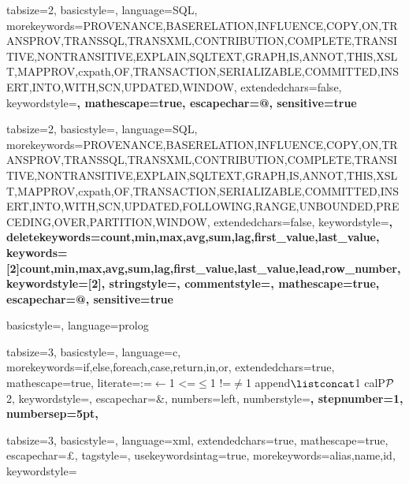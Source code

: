


{
tabsize=2,
basicstyle=\footnotesize\upshape\ttfamily,
language=SQL,
morekeywords={PROVENANCE,BASERELATION,INFLUENCE,COPY,ON,TRANSPROV,TRANSSQL,TRANSXML,CONTRIBUTION,COMPLETE,TRANSITIVE,NONTRANSITIVE,EXPLAIN,SQLTEXT,GRAPH,IS,ANNOT,THIS,XSLT,MAPPROV,cxpath,OF,TRANSACTION,SERIALIZABLE,COMMITTED,INSERT,INTO,WITH,SCN,UPDATED,WINDOW},
extendedchars=false,
keywordstyle=\bfseries,
mathescape=true,
escapechar=@,
sensitive=true
}


{
tabsize=2,
basicstyle=\footnotesize\upshape\ttfamily,
language=SQL,
morekeywords={PROVENANCE,BASERELATION,INFLUENCE,COPY,ON,TRANSPROV,TRANSSQL,TRANSXML,CONTRIBUTION,COMPLETE,TRANSITIVE,NONTRANSITIVE,EXPLAIN,SQLTEXT,GRAPH,IS,ANNOT,THIS,XSLT,MAPPROV,cxpath,OF,TRANSACTION,SERIALIZABLE,COMMITTED,INSERT,INTO,WITH,SCN,UPDATED,FOLLOWING,RANGE,UNBOUNDED,PRECEDING,OVER,PARTITION,WINDOW},
extendedchars=false,
keywordstyle=\bfseries\color{lstpurple},
deletekeywords={count,min,max,avg,sum,lag,first_value,last_value},
keywords=[2]{count,min,max,avg,sum,lag,first_value,last_value,lead,row_number},
keywordstyle=[2]\color{lstblue},
stringstyle=\color{lstreddark},
commentstyle=\color{lstgreen},
mathescape=true,
escapechar=@,
sensitive=true
}


{
basicstyle=\footnotesize\upshape\ttfamily,
language=prolog
}




{
  tabsize=3,
  basicstyle=\small,
  language=c,
  morekeywords={if,else,foreach,case,return,in,or},
  extendedchars=true,
  mathescape=true,
  literate={:=}{{$\gets$}}1 {<=}{{$\leq$}}1 {!=}{{$\neq$}}1 {append}{{$\listconcat$}}1 {calP}{{$\cal P$}}{2},
  keywordstyle=\color{lstpurple},
  escapechar=&,
  numbers=left,
  numberstyle=\color{lstgreen}\small\bfseries,
  stepnumber=1,
  numbersep=5pt,
}

{
  tabsize=3,
  basicstyle=\small,
  language=xml,
  extendedchars=true,
  mathescape=true,
  escapechar=£,
  tagstyle=\color{keywordpurple},
  usekeywordsintag=true,
  morekeywords={alias,name,id},
  keywordstyle=\color{lstred}
}
